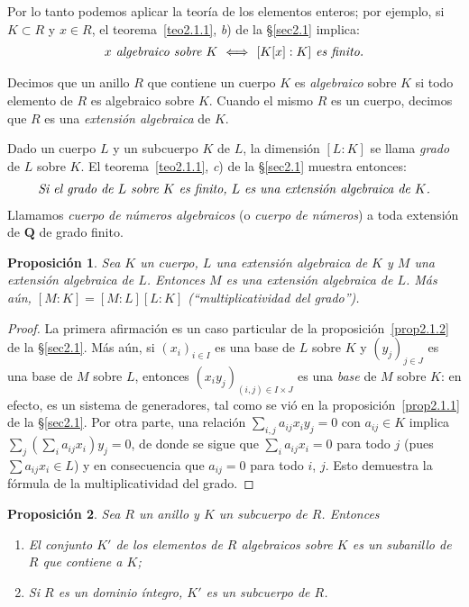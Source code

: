 \documentclass[10pt,oneside,bibtotoc,smallheadings,leqno,a5paper,DIV=12]{scrbook}
\newcommand{\QQ}{\mathbf{Q}}
\numberwithin{equation}{section}
\theoremstyle{defi}
\theoremstyle{enonce}
\newtheorem{proposition}{Proposici\'on}
\theoremstyle{rem}
\numberwithin{theorem}{section}
\numberwithin{proposition}{section}
\numberwithin{definition}{section}
\numberwithin{lemma}{section}
\numberwithin{corollary}{section}
\numberwithin{example}{section}
\numberwithin{footnote}{section}%
\begin{document}
Por lo tanto podemos aplicar la teor\'ia de los elementos enteros; por ejemplo, si $K\subset R$ y $x\in R$,
el teorema~\ref{teo2.1.1}, {\itshape b}) de la \S\ref{sec2.1} implica:
\begin{gather}
\text{\itshape $x$ algebraico sobre $K$ $\iff$ $[K[x]:K]$ es finito.}
\end{gather}

Decimos que un anillo $R$ que contiene un cuerpo $K$ es {\em algebraico} sobre $K$ si todo elemento de $R$
es algebraico sobre $K$. Cuando el mismo $R$ es un cuerpo, decimos que $R$ es una {\em extensi\'on algebraica}
de $K$.

Dado un cuerpo $L$ y un subcuerpo $K$ de $L$, la dimensi\'on $[L:K]$ se llama {\em grado} de $L$ sobre $K$.
El teorema~\ref{teo2.1.1}, {\itshape c}) de la \S\ref{sec2.1} muestra entonces:
\begin{gather}
\text{\itshape Si el grado de $L$ sobre $K$ es finito, $L$ es una extensi\'on algebraica de $K$.}
\end{gather}
Llamamos {\em cuerpo de n\'umeros algebraicos} (o {\em cuerpo de n\'umeros}) a toda extensi\'on de $\QQ$
de grado finito.

\begin{proposition}\label{prop2.3.1}
Sea $K$ un cuerpo, $L$ una extensi\'on algebraica de $K$ y $M$ una extensi\'on algebraica de $L$. Entonces
$M$ es una extensi\'on algebraica de $L$. M\'as a\'un, $[M:K] = [M:L][L:K]$
(``multiplicatividad del grado'').
\end{proposition}

\begin{proof}
La primera afirmaci\'on es un caso particular de la proposici\'on~\ref{prop2.1.2} de la \S\ref{sec2.1}.
M\'as a\'un, si $(x_{i})_{i\in I}$
es una base de $L$ sobre $K$ y $(y_{j})_{j\in J}$ es una base de $M$ sobre $L$, entonces $(x_{i}y_{j})_{(i,j)\in I\times J}$
es una {\em base} de $M$ sobre $K$: en efecto, es un sistema de generadores, tal como se vi\'o en la
proposici\'on~\ref{prop2.1.1} de la \S\ref{sec2.1}.
Por otra parte, una relaci\'on $\sum_{i,j}a_{ij}x_{i}y_{j} = 0$ con $a_{ij}\in K$ implica
$\sum_{j}\left(\sum_{i}a_{ij}x_{i}\right)y_{j} = 0$, de donde se sigue que
$\sum_{i}a_{ij}x_{i} = 0$ para todo $j$ (pues
$\sum a_{ij}x_{i}\in L$) y en consecuencia que $a_{ij} = 0$ para todo $i$, $j$. Esto demuestra la f\'ormula
de la multiplicatividad del grado.
\end{proof}

\begin{proposition}
Sea $R$ un anillo y $K$ un subcuerpo de $R$. Entonces
\begin{enumerate}
\item[\upshape a)] El conjunto $K'$ de los elementos de $R$ algebraicos sobre $K$ es un subanillo de $R$ que contiene a $K$;
\item[\upshape b)] Si $R$ es un dominio \'integro, $K'$ es un subcuerpo de $R$.
\end{enumerate}
\end{proposition}
\end{document}

